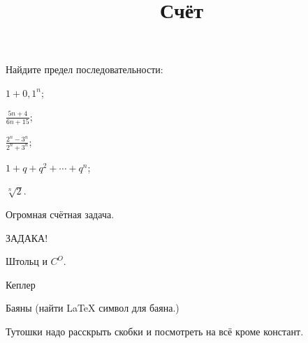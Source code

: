 \documentclass[a4paper, 12pt, num=31]{listok}
\begin{document}
\title{Счёт}
\maketitle{}
\begin{problem}
    Найдите предел последовательности:
    \begin{multienum}{3}
        \item $1 + {0{,}1}^n$;
        \item $\frac{5n + 4}{6n + 15}$;
        \item $\frac{2^n - 3^n}{2^n + 3^n}$;
        \item $1 + q + q^2 + \cdots + q^n$;
        \item $\sqrt[n]{2}$.
    \end{multienum}
\end{problem}
\begin{problem}
    Огромная счётная задача.
\end{problem}
\begin{problem}
    ЗАДАКА!
\end{problem}
\begin{problem}
    Штольц и $C^O$.
\end{problem}
\begin{problem}
    Кеплер
\end{problem}
\begin{problem}
    Баяны (найти \LaTeX{} символ для баяна.)
\end{problem}
Тутошки надо расскрыть скобки и посмотреть на всё кроме констант.
\end{document}
